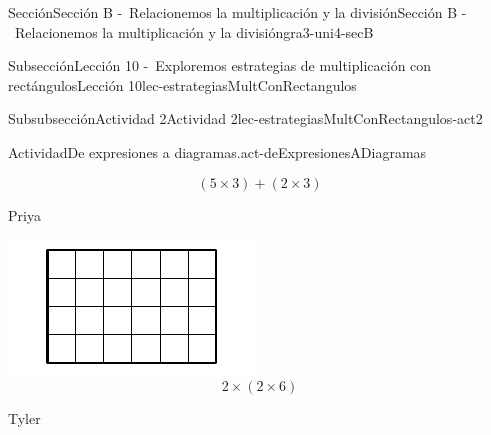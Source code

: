 \documentclass[twoside,10pt,]{article}
\begin{document}
\begin{sectionptx}{Sección}{Sección B -~Relacionemos la multiplicación y la división}{}{Sección B -~Relacionemos la multiplicación y la división}{}{}{gra3-uni4-secB}
\begin{subsectionptx}{Subsección}{Lección 10 -~Exploremos estrategias de multiplicación con rectángulos}{}{Lección 10}{}{}{lec-estrategiasMultConRectangulos}
\begin{subsubsectionptx}{Subsubsección}{Actividad 2}{}{Actividad 2}{}{}{lec-estrategiasMultConRectangulos-act2}
\begin{activity}{Actividad}{De expresiones a diagramas.}{act-deExpresionesADiagramas}
\begin{sidebyside}{3}{0.0166666666666667}{0.0166666666666667}{0.0333333333333333}
\begin{sbspanel}{0.3}
%
\begin{equation*}
(5\times 3)+(2 \times 3)
\end{equation*}
%
\end{sbspanel}%
\begin{sbspanel}{0.3}%
Priya%
\par
\includegraphics[width=\linewidth]{external/svg-source/tikz-file-153053.pdf}
%
\begin{equation*}
2 \times (2 \times 6)
\end{equation*}
%
\end{sbspanel}%
\begin{sbspanel}{0.3}%
Tyler%
\par

\end{sbspanel}
\end{sidebyside}
\end{activity}
\end{subsubsectionptx}
\end{subsectionptx}
\end{sectionptx}
\end{document}

